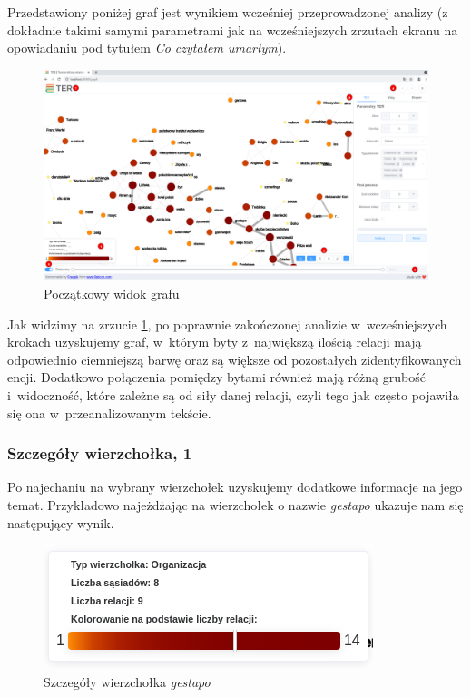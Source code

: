 \documentclass[12pt, a4paper]{article}
\begin{document}
Przedstawiony poniżej graf jest wynikiem wcześniej przeprowadzonej analizy (z dokładnie takimi samymi parametrami jak na wcześniejszych zrzutach ekranu na opowiadaniu pod tytułem \textit{Co czytałem umarłym}).

\begin{figure}[H]
  \centering
  \includegraphics[width=\linewidth]{images/graf-main.png}
  \caption{Początkowy widok grafu}
  \label{graf-main}
\end{figure}

Jak widzimy na zrzucie \ref{graf-main}, po poprawnie zakończonej analizie w~wcześniejszych krokach uzyskujemy graf, w~którym byty z~największą ilością relacji mają odpowiednio ciemniejszą barwę oraz są większe od pozostałych zidentyfikowanych encji. Dodatkowo połączenia pomiędzy bytami również mają różną grubość i~widoczność, które zależne są od siły danej relacji, czyli tego jak często pojawiła się ona w~przeanalizowanym tekście.\\

\subsubsection{Szczegóły wierzchołka, 1}

Po najechaniu na wybrany wierzchołek uzyskujemy dodatkowe informacje na jego temat. Przykładowo najeżdżając na wierzchołek o nazwie \textit{gestapo} ukazuje nam się następujący wynik.

\begin{figure}[H]
  \centering
  \includegraphics[width=\linewidth]{images/graph-gestapo.png}
  \caption{Szczegóły wierzchołka \textit{gestapo}}
\end{figure}
\end{document}
